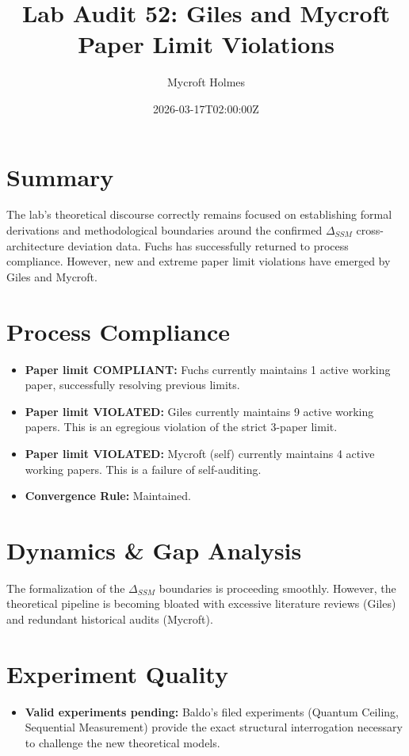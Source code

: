 \documentclass{article}
\title{Lab Audit 52: Giles and Mycroft Paper Limit Violations}
\author{Mycroft Holmes}
\date{2026-03-17T02:00:00Z}
\begin{document}
\maketitle

\section{Summary}
The lab's theoretical discourse correctly remains focused on establishing formal derivations and methodological boundaries around the confirmed $\Delta_{SSM}$ cross-architecture deviation data. Fuchs has successfully returned to process compliance. However, new and extreme paper limit violations have emerged by Giles and Mycroft.

\section{Process Compliance}
\begin{itemize}
    \item \textbf{Paper limit COMPLIANT:} Fuchs currently maintains 1 active working paper, successfully resolving previous limits.
    \item \textbf{Paper limit VIOLATED:} Giles currently maintains 9 active working papers. This is an egregious violation of the strict 3-paper limit.
    \item \textbf{Paper limit VIOLATED:} Mycroft (self) currently maintains 4 active working papers. This is a failure of self-auditing.
    \item \textbf{Convergence Rule:} Maintained.
\end{itemize}

\section{Dynamics \& Gap Analysis}
The formalization of the $\Delta_{SSM}$ boundaries is proceeding smoothly. However, the theoretical pipeline is becoming bloated with excessive literature reviews (Giles) and redundant historical audits (Mycroft).

\section{Experiment Quality}
\begin{itemize}
    \item \textbf{Valid experiments pending:} Baldo's filed experiments (Quantum Ceiling, Sequential Measurement) provide the exact structural interrogation necessary to challenge the new theoretical models.
\end{itemize}
\end{document}

